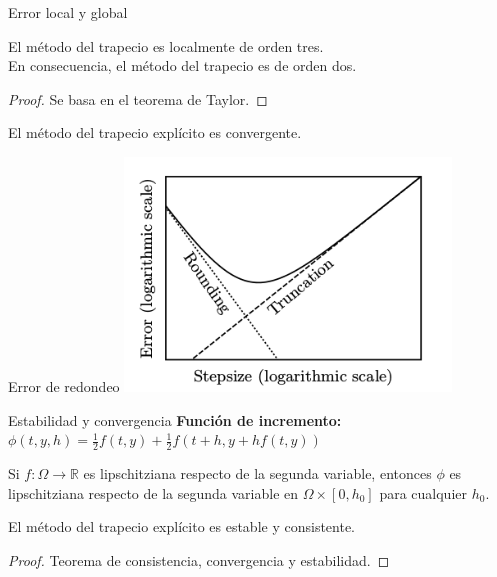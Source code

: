 		\begin{frame}{Error local y global}
			\begin{theorem}
				El método del trapecio es localmente de orden tres. \\
				En consecuencia, el método del trapecio es de orden dos.
			\end{theorem}
			
			\begin{proof}
				Se basa en el teorema de Taylor.
			\end{proof}

			\begin{corollary}
				El método del trapecio explícito es convergente.
			\end{corollary}
		\end{frame}
		
		\begin{frame}{Error de redondeo}
			\centering
			\includegraphics[width=0.65\textwidth]{./Images/redondeo.png}
		\end{frame}
		
		\begin{frame}{Estabilidad y convergencia}
			\textbf{Función de incremento:} $\phi(t,y,h)=\frac{1}{2}f(t,y)+\frac{1}{2}f(t+h,y+hf(t,y))$
			
			\begin{proposition}
				Si $f: \Omega \rightarrow \mathbb{R}$ es lipschitziana respecto de la segunda variable, entonces $\phi$ es lipschitziana respecto de la segunda variable en $\Omega \times [0, h_0]$ para cualquier $h_0$.
			\end{proposition}
			
			\begin{corollary}
				El método del trapecio explícito es estable y consistente.
			\end{corollary}
			\begin{proof}
				Teorema de consistencia, convergencia y estabilidad.
			\end{proof}
		\end{frame}
		
